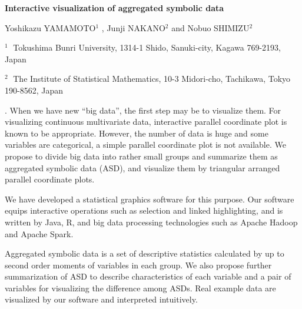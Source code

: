 \documentclass[12pt]{article}
\begin{document}
\begin{flushleft}


{\LARGE\bf Interactive visualization of aggregated symbolic data}


\vspace{1.0cm}

Yoshikazu YAMAMOTO$^1$ , Junji NAKANO$^2$ and Nobuo SHIMIZU$^2$

\begin{description}

\item $^1 \;$
Tokushima Bunri University,
1314-1 Shido, Sanuki-city, Kagawa 769-2193, Japan

\item $^2 \;$
The Institute of Statistical Mathematics,
10-3 Midori-cho, Tachikawa, Tokyo 190-8562, Japan

\end{description}

\end{flushleft}


\vspace{0.75cm}

.
When we have new ``big data'', the first step may be to visualize them.
For visualizing continuous multivariate data, interactive parallel coordinate plot is known to be appropriate.
However, the number of data is huge and some variables are categorical, a simple parallel coordinate plot is not available.
We propose to divide big data into rather small groups and summarize them as aggregated symbolic data (ASD), and visualize them by triangular arranged parallel coordinate plots.

We have developed a statistical graphics software for this purpose.
Our software equips interactive operations such as selection and linked highlighting, and is written by Java, R, and big data processing technologies such as Apache Hadoop and Apache Spark.

Aggregated symbolic data is a set of descriptive statistics calculated by up to second order moments of variables in each group.
We also propose further summarization of ASD to describe characteristics of each variable and a pair of variables for visualizing the difference among ASDs.
Real example data are visualized by our software and interpreted intuitively.

\vskip 2mm
\end{document}
